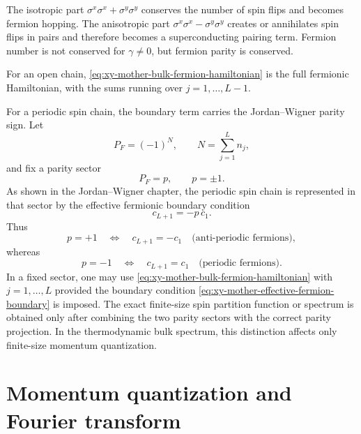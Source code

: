\begin{remark}
The isotropic part
$\sigma^x\sigma^x+\sigma^y\sigma^y$ conserves the number of spin flips and becomes
fermion hopping.  The anisotropic part
$\sigma^x\sigma^x-\sigma^y\sigma^y$ creates or annihilates spin flips in pairs and
therefore becomes a superconducting pairing term.  Fermion number is not
conserved for $\gamma\neq0$, but fermion parity is conserved.
\end{remark}

For an open chain, \cref{eq:xy-mother-bulk-fermion-hamiltonian} is the full
fermionic Hamiltonian, with the sums running over $j=1,\ldots,L-1$.

For a periodic spin chain, the boundary term carries the Jordan--Wigner parity
sign.  Let
\begin{equation}
\label{eq:xy-mother-fermion-parity}
    P_F=(-1)^N,
    \qquad
    N=\sum_{j=1}^{L}n_j,
\end{equation}
and fix a parity sector
\begin{equation}
    P_F=p,
    \qquad
    p=\pm1.
\end{equation}
As shown in the Jordan--Wigner chapter, the periodic spin chain is represented in
that sector by the effective fermionic boundary condition
\begin{equation}
\label{eq:xy-mother-effective-fermion-boundary}
    c_{L+1}=-p\,c_1.
\end{equation}
Thus
\begin{equation}
\label{eq:xy-mother-pbc-apbc-sector}
    p=+1
    \quad\Longleftrightarrow\quad
    c_{L+1}=-c_1
    \quad\text{(anti-periodic fermions)},
\end{equation}
whereas
\begin{equation}
\label{eq:xy-mother-pbc-pbc-sector}
    p=-1
    \quad\Longleftrightarrow\quad
    c_{L+1}=c_1
    \quad\text{(periodic fermions)}.
\end{equation}
In a fixed sector, one may use
\cref{eq:xy-mother-bulk-fermion-hamiltonian} with $j=1,\ldots,L$ provided the
boundary condition \cref{eq:xy-mother-effective-fermion-boundary} is imposed.  The
exact finite-size spin partition function or spectrum is obtained only after
combining the two parity sectors with the correct parity projection.  In the
thermodynamic bulk spectrum, this distinction affects only finite-size momentum
quantization.

\section{Momentum quantization and Fourier transform}
\label{sec:xy-momentum-quantization-fourier}

